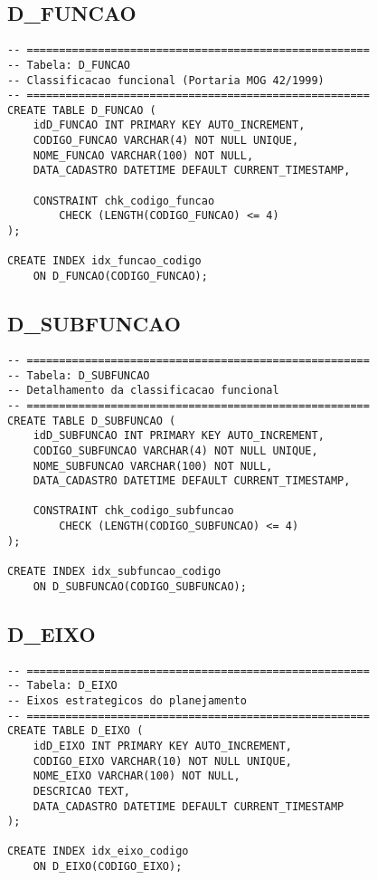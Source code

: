 \documentclass[12pt,a4paper]{article}
\begin{document}
\subsection{D\_FUNCAO}

\begin{lstlisting}
-- =====================================================
-- Tabela: D_FUNCAO
-- Classificacao funcional (Portaria MOG 42/1999)
-- =====================================================
CREATE TABLE D_FUNCAO (
    idD_FUNCAO INT PRIMARY KEY AUTO_INCREMENT,
    CODIGO_FUNCAO VARCHAR(4) NOT NULL UNIQUE,
    NOME_FUNCAO VARCHAR(100) NOT NULL,
    DATA_CADASTRO DATETIME DEFAULT CURRENT_TIMESTAMP,
    
    CONSTRAINT chk_codigo_funcao 
        CHECK (LENGTH(CODIGO_FUNCAO) <= 4)
);

CREATE INDEX idx_funcao_codigo 
    ON D_FUNCAO(CODIGO_FUNCAO);
\end{lstlisting}

\subsection{D\_SUBFUNCAO}

\begin{lstlisting}
-- =====================================================
-- Tabela: D_SUBFUNCAO
-- Detalhamento da classificacao funcional
-- =====================================================
CREATE TABLE D_SUBFUNCAO (
    idD_SUBFUNCAO INT PRIMARY KEY AUTO_INCREMENT,
    CODIGO_SUBFUNCAO VARCHAR(4) NOT NULL UNIQUE,
    NOME_SUBFUNCAO VARCHAR(100) NOT NULL,
    DATA_CADASTRO DATETIME DEFAULT CURRENT_TIMESTAMP,
    
    CONSTRAINT chk_codigo_subfuncao 
        CHECK (LENGTH(CODIGO_SUBFUNCAO) <= 4)
);

CREATE INDEX idx_subfuncao_codigo 
    ON D_SUBFUNCAO(CODIGO_SUBFUNCAO);
\end{lstlisting}

\subsection{D\_EIXO}

\begin{lstlisting}
-- =====================================================
-- Tabela: D_EIXO
-- Eixos estrategicos do planejamento
-- =====================================================
CREATE TABLE D_EIXO (
    idD_EIXO INT PRIMARY KEY AUTO_INCREMENT,
    CODIGO_EIXO VARCHAR(10) NOT NULL UNIQUE,
    NOME_EIXO VARCHAR(100) NOT NULL,
    DESCRICAO TEXT,
    DATA_CADASTRO DATETIME DEFAULT CURRENT_TIMESTAMP
);

CREATE INDEX idx_eixo_codigo 
    ON D_EIXO(CODIGO_EIXO);
\end{lstlisting}
\end{document}

